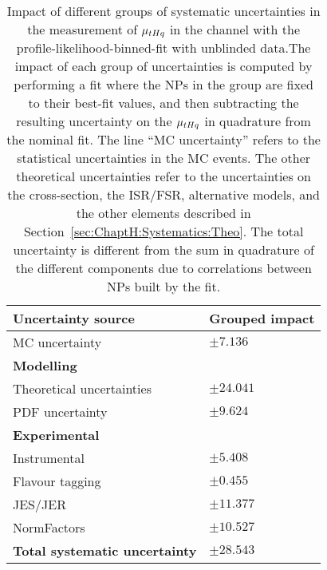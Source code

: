 \begin{table}[h] %
\centering
\begin{tabular}{l|l}
\toprule
\textbf{Uncertainty source}	& Grouped impact	\\
\midrule
MC uncertainty				& $\pm 7.136$		\\
\midrule
\textbf{Modelling}			&            			\\
Theoretical uncertainties			& $\pm  24.041$	\\
PDF uncertainty			& $\pm 9.624$ \\

\midrule
\textbf{Experimental}			&				\\
Instrumental				& $\pm 5.408$	\\
Flavour tagging				& $\pm 0.455$	\\
JES/JER					& $\pm 11.377$	\\
\midrule
NormFactors				& $\pm 10.527$	\\
\midrule
\textbf{Total systematic uncertainty} & $\pm 28.543$\\
\bottomrule   
\end{tabular}
\caption{Impact of different groups of systematic uncertainties in the measurement of $\mu_{tHq}$ in 
the \dilepOStau channel with the profile-likelihood-binned-fit with unblinded 
data.The impact of each group of uncertainties is computed 
by performing a fit where the NPs in the group are fixed to their best-fit values, and then subtracting the resulting 
uncertainty on the $\mu_{tHq}$ in quadrature from the nominal fit. The line ``MC uncertainty'' refers to the statistical 
uncertainties in the MC events.
The other theoretical uncertainties refer to the uncertainties on the cross-section, the ISR/FSR, alternative models, and
the other elements described in Section~\ref{sec:ChaptH:Systematics:Theo}.
The total uncertainty is different from the sum in quadrature of the different components due to correlations between
NPs built by the fit.}
\label{tab:ChaptH:Unblinded:GroupedSyst:OS}
\end{table}





